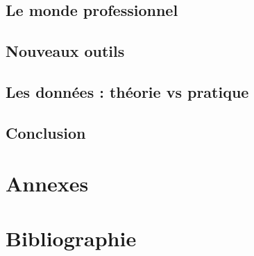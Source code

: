 \documentclass{book}
\begin{document}
\subsection{Le monde professionnel}
\subsection{Nouveaux outils}
\subsection{Les données : théorie vs pratique}

\newpage
\begin{center}
\section*{Conclusion}
\end{center}

\backmatter
\section{Annexes}
\section{Bibliographie}
\end{document}
